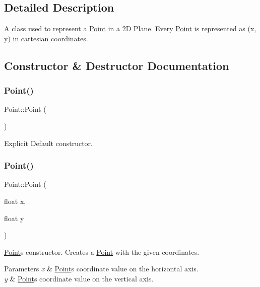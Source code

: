 \subsection{Detailed Description}
A class used to represent a \hyperlink{class_point}{Point} in a 2D Plane. Every \hyperlink{class_point}{Point} is represented as (x, y) in cartesian coordinates. 

\subsection{Constructor \& Destructor Documentation}
\hypertarget{class_point_a257415ad611a16bb73628efcdb87d0fd}{}\label{class_point_a257415ad611a16bb73628efcdb87d0fd} 
\subsubsection{\texorpdfstring{Point()}{Point()}\hspace{0.1cm}{\footnotesize\ttfamily [1/2]}}
{\footnotesize\ttfamily Point\+::\+Point (\begin{DoxyParamCaption}{ }\end{DoxyParamCaption})\hspace{0.3cm}{\ttfamily [default]}}

Explicit Default constructor. \hypertarget{class_point_a30bc8409287de4f43e160664be834636}{}\label{class_point_a30bc8409287de4f43e160664be834636} 
\subsubsection{\texorpdfstring{Point()}{Point()}\hspace{0.1cm}{\footnotesize\ttfamily [2/2]}}
{\footnotesize\ttfamily Point\+::\+Point (\begin{DoxyParamCaption}\item[{float}]{x,  }\item[{float}]{y }\end{DoxyParamCaption})}

\hyperlink{class_point}{Point}\textquotesingle{}s constructor. Creates a \hyperlink{class_point}{Point} with the given coordinates.


\begin{DoxyParams}{Parameters}
{\em x} & \hyperlink{class_point}{Point}\textquotesingle{}s coordinate value on the horizontal axis. \\
\hline
{\em y} & \hyperlink{class_point}{Point}\textquotesingle{}s coordinate value on the vertical axis. \\
\hline
\end{DoxyParams}


